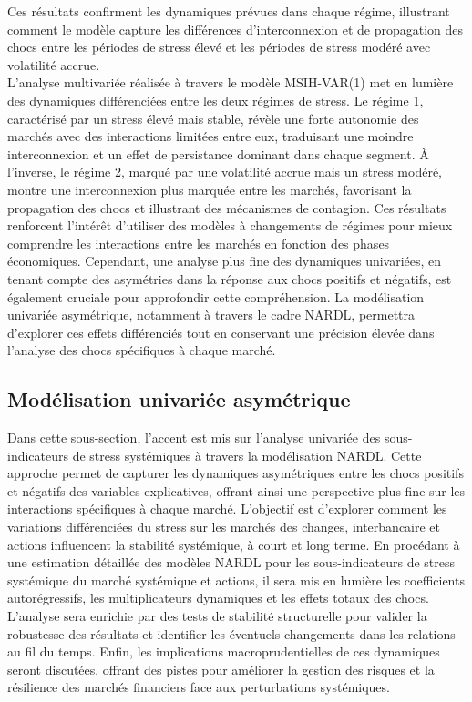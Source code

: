 Ces résultats confirment les dynamiques prévues dans chaque régime, illustrant comment le modèle capture les différences d'interconnexion et de propagation des chocs entre les périodes de stress élevé et les périodes de stress modéré avec volatilité accrue.\\

L'analyse multivariée réalisée à travers le modèle MSIH-VAR(1) met en lumière des dynamiques différenciées entre les deux régimes de stress. Le régime 1, caractérisé par un stress élevé mais stable, révèle une forte autonomie des marchés avec des interactions limitées entre eux, traduisant une moindre interconnexion et un effet de persistance dominant dans chaque segment. À l'inverse, le régime 2, marqué par une volatilité accrue mais un stress modéré, montre une interconnexion plus marquée entre les marchés, favorisant la propagation des chocs et illustrant des mécanismes de contagion. Ces résultats renforcent l'intérêt d'utiliser des modèles à changements de régimes pour mieux comprendre les interactions entre les marchés en fonction des phases économiques. Cependant, une analyse plus fine des dynamiques univariées, en tenant compte des asymétries dans la réponse aux chocs positifs et négatifs, est également cruciale pour approfondir cette compréhension. La modélisation univariée asymétrique, notamment à travers le cadre NARDL, permettra d'explorer ces effets différenciés tout en conservant une précision élevée dans l’analyse des chocs spécifiques à chaque marché.

\subsection{Modélisation univariée asymétrique}

Dans cette sous-section, l'accent est mis sur l’analyse univariée des sous-indicateurs de stress systémiques à travers la modélisation NARDL. Cette approche permet de capturer les dynamiques asymétriques entre les chocs positifs et négatifs des variables explicatives, offrant ainsi une perspective plus fine sur les interactions spécifiques à chaque marché. L’objectif est d’explorer comment les variations différenciées du stress sur les marchés des changes, interbancaire et actions influencent la stabilité systémique, à court et long terme. En procédant à une estimation détaillée des modèles NARDL pour les sous-indicateurs de stress systémique du marché systémique et actions, il sera mis en lumière les coefficients autorégressifs, les multiplicateurs dynamiques et les effets totaux des chocs. L’analyse sera enrichie par des tests de stabilité structurelle pour valider la robustesse des résultats et identifier les éventuels changements dans les relations au fil du temps. Enfin, les implications macroprudentielles de ces dynamiques seront discutées, offrant des pistes pour améliorer la gestion des risques et la résilience des marchés financiers face aux perturbations systémiques.

